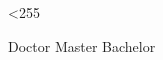 
\makeatletter
{}
\loop \catcode{} \ifnum\@tempcnta<255 \advance \@tempcnta \@ne
\repeat
\makeatother

\newif\ifxueweidoctor %
\newif\ifxueweimaster
\newif\ifxueweibachelor
\def\temp{Doctor}
\ifx\temp\xuewei
  \xueweidoctortrue  \xueweimasterfalse  \xueweibachelorfalse
\fi
\def\temp{Master}
\ifx\temp\xuewei
  \xueweidoctorfalse  \xueweimastertrue  \xueweibachelorfalse
\fi
\def\temp{Bachelor}
\ifx\temp\xuewei
  \xueweidoctorfalse  \xueweimasterfalse  \xueweibachelortrue
\fi

\ifxueweidoctor
  \newcommand{\cxuewei}{博士}
  \newcommand{\exuewei}{Doctor}
  \newcommand{\exueweier}{Doctoral}
  \newcommand{\xueweishort}{博}
\fi

\ifxueweimaster
  \newcommand{\cxuewei}{硕士}
  \newcommand{\exuewei}{Master}
  \newcommand{\exueweier}{Master's}
  \newcommand{\xueweishort}{硕}
\fi

\ifxueweibachelor
  \newcommand{\cxuewei}{本科}
  \newcommand{\exuewei}{Bachelor}
  \newcommand{\exueweier}{Bachelor}
  \newcommand{\xueweishort}{本}
\fi